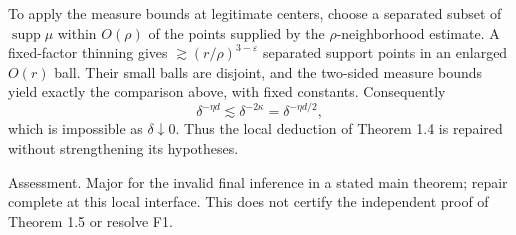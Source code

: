 \documentclass[10pt]{article}
\begin{document}
To apply the measure bounds at legitimate centers, choose a separated subset of \(\operatorname{supp}\mu\) within \(O(\rho)\) of the points supplied by the \(\rho\)-neighborhood estimate. A fixed-factor thinning gives \(\gtrsim(r/\rho)^{3-\varepsilon}\) separated support points in an enlarged \(O(r)\) ball. Their small balls are disjoint, and the two-sided measure bounds yield exactly the comparison above, with fixed constants. Consequently \[\delta^{-\eta d}\lesssim\delta^{-2\kappa}
 =\delta^{-\eta d/2},\] which is impossible as \(\delta\downarrow0\). Thus the local deduction of Theorem 1.4 is repaired without strengthening its hypotheses.\par
Assessment. Major for the invalid final inference in a stated main theorem; repair complete at this local interface. This does not certify the independent proof of Theorem 1.5 or resolve F1.\par
\end{document}
